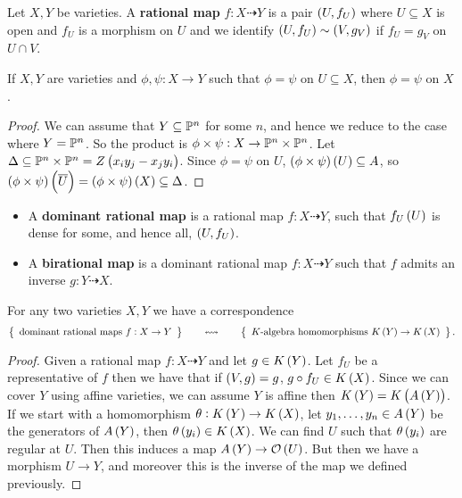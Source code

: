 
\begin{definition}
Let $ X, Y $ be varieties. A \textbf{rational map} $ f : X \dashrightarrow Y $ is a pair $ \br{U, f_U} $ where $ U \subseteq X $ is open and $ f_U $ is a morphism on $ U $ and we identify $ \br{U, f_U} \sim \br{V, g_V} $ if $ f_U = g_V $ on $ U \cap V $.
\end{definition}

\begin{lemma}
If $ X, Y $ are varieties and $ \phi, \psi : X \to Y $ such that $ \phi = \psi $ on $ U \subseteq X $, then $ \phi = \psi $ on $ X $.
\end{lemma}

\begin{proof}
We can assume that $ Y \subseteq \P^n $ for some $ n $, and hence we reduce to the case where $ Y = \P^n $. So the product is $ \phi \times \psi : X \to \P^n \times \P^n $. Let $ \Delta \subseteq \P^n \times \P^n = Z\br{x_iy_j - x_jy_i} $. Since $ \phi = \psi $ on $ U $, $ \br{\phi \times \psi}\br{U} \subseteq A $, so $ \br{\phi \times \psi}\br{\overline{U}} = \br{\phi \times \psi}\br{X} \subseteq \Delta $.
\end{proof}

\begin{definition}
\hfill
\begin{itemize}
\item A \textbf{dominant rational map} is a rational map $ f : X \dashrightarrow Y $, such that $ f_U\br{U} $ is dense for some, and hence all, $ \br{U, f_U} $.
\item A \textbf{birational map} is a dominant rational map $ f : X \dashrightarrow Y $ such that $ f $ admits an inverse $ g : Y \dashrightarrow X $.
\end{itemize}
\end{definition}

\begin{theorem}
For any two varieties $ X, Y $ we have a correspondence
$$ \correspondence{\text{dominant rational maps} \ f : X \to Y}{K \text{-algebra homomorphisms} \ K\br{Y} \to K\br{X}}. $$
\end{theorem}

\begin{proof}
Given a rational map $ f : X \dashrightarrow Y $ and let $ g \in K\br{Y} $. Let $ f_U $ be a representative of $ f $ then we have that if $ \br{V, g} = g $, $ g \circ f_U \in K\br{X} $. Since we can cover $ Y $ using affine varieties, we can assume $ Y $ is affine then $ K\br{Y} = K\br{A\br{Y}} $. If we start with a homomorphism $ \theta : K\br{Y} \to K\br{X} $, let $ y_1, \dots, y_n \in A\br{Y} $ be the generators of $ A\br{Y} $, then $ \theta\br{y_i} \in K\br{X} $. We can find $ U $ such that $ \theta\br{y_i} $ are regular at $ U $. Then this induces a map $ A\br{Y} \to \OO\br{U} $. But then we have a morphism $ U \to Y $, and moreover this is the inverse of the map we defined previously.
\end{proof}

